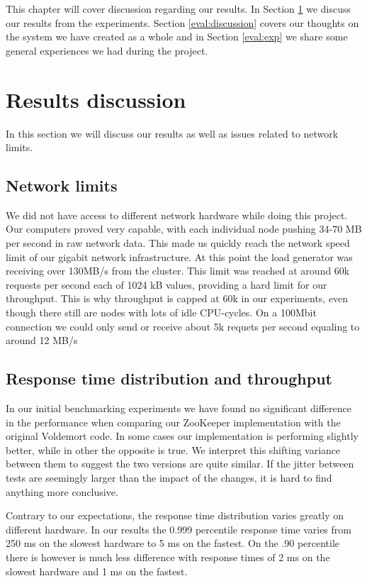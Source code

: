This chapter will cover discussion regarding our results. In Section \ref{eval:results} we discuss our results from the experiments. Section \ref{eval:discussion} covers our thoughts on the system we have created as a whole and in Section \ref{eval:exp} we share some general experiences we had during the project.

\section{Results discussion}
\label{eval:results}
In this section we will discuss our results as well as issues related to network limits.  

\subsection{Network limits}
We did not have access to different network hardware while doing this project. Our computers proved very capable, with each individual node pushing 34-70 MB per second in raw network data. This made us quickly reach the network speed limit of our gigabit network infrastructure. At this point the load generator was receiving over 130MB/s from the cluster. This limit was reached at around 60k requests per second each of 1024 kB values, providing a hard limit for our throughput. This is why throughput is capped at 60k in our experiments, even though there still are nodes with lots of idle CPU-cycles. On a 100Mbit connection we could only send or receive about 5k requets per second equaling to around 12 MB/s

\subsection{Response time distribution and throughput}
\label{eval:performance}
In our initial benchmarking experiments we have found no significant difference in the performance when comparing our ZooKeeper implementation with the original Voldemort code. In some cases our implementation is performing slightly better, while in other the opposite is true. We interpret this shifting variance between them to suggest the two versions are quite similar. If the jitter between tests are seemingly larger than the impact of the changes, it is hard to find anything more conclusive.

Contrary to our expectations, the response time distribution varies greatly on different hardware. In our results the 0.999 percentile response time varies from 250 ms on the slowest hardware to 5 ms on the fastest. On the .90 percentile there is however is much less difference with response times of 2 ms on the slowest hardware and 1 ms on the fastest.

